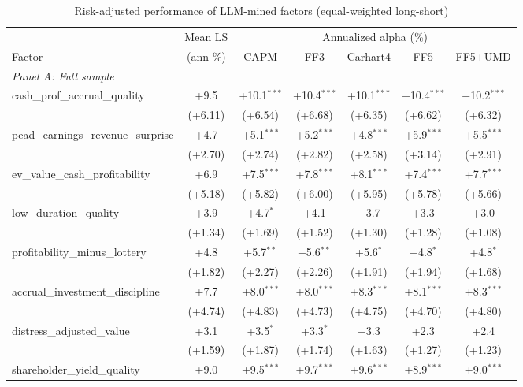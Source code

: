 \begin{table}[htbp]\centering
\caption{Risk-adjusted performance of LLM-mined factors (equal-weighted long-short)}
\label{tab:alphas_ew}
\begin{threeparttable}\footnotesize
\begin{tabular}{lcccccc}
\toprule
 & Mean LS & \multicolumn{5}{c}{Annualized alpha (\%)} \\
\cmidrule(lr){3-7}
Factor & (ann \%) & CAPM & FF3 & Carhart4 & FF5 & FF5+UMD \\
\midrule
\multicolumn{7}{l}{\textit{Panel A: Full sample}} \\
\addlinespace
cash\_prof\_accrual\_quality & +9.5 & +10.1$^{***}$ & +10.4$^{***}$ & +10.1$^{***}$ & +10.4$^{***}$ & +10.2$^{***}$ \\
 & (+6.11) & (+6.54) & (+6.68) & (+6.35) & (+6.62) & (+6.32) \\
\addlinespace
pead\_earnings\_revenue\_surprise & +4.7 & +5.1$^{***}$ & +5.2$^{***}$ & +4.8$^{***}$ & +5.9$^{***}$ & +5.5$^{***}$ \\
 & (+2.70) & (+2.74) & (+2.82) & (+2.58) & (+3.14) & (+2.91) \\
\addlinespace
ev\_value\_cash\_profitability & +6.9 & +7.5$^{***}$ & +7.8$^{***}$ & +8.1$^{***}$ & +7.4$^{***}$ & +7.7$^{***}$ \\
 & (+5.18) & (+5.82) & (+6.00) & (+5.95) & (+5.78) & (+5.66) \\
\addlinespace
low\_duration\_quality & +3.9 & +4.7$^{*}$ & +4.1 & +3.7 & +3.3 & +3.0 \\
 & (+1.34) & (+1.69) & (+1.52) & (+1.30) & (+1.28) & (+1.08) \\
\addlinespace
profitability\_minus\_lottery & +4.8 & +5.7$^{**}$ & +5.6$^{**}$ & +5.6$^{*}$ & +4.8$^{*}$ & +4.8$^{*}$ \\
 & (+1.82) & (+2.27) & (+2.26) & (+1.91) & (+1.94) & (+1.68) \\
\addlinespace
accrual\_investment\_discipline & +7.7 & +8.0$^{***}$ & +8.0$^{***}$ & +8.3$^{***}$ & +8.1$^{***}$ & +8.3$^{***}$ \\
 & (+4.74) & (+4.83) & (+4.73) & (+4.75) & (+4.70) & (+4.80) \\
\addlinespace
distress\_adjusted\_value & +3.1 & +3.5$^{*}$ & +3.3$^{*}$ & +3.3 & +2.3 & +2.4 \\
 & (+1.59) & (+1.87) & (+1.74) & (+1.63) & (+1.27) & (+1.23) \\
\addlinespace
shareholder\_yield\_quality & +9.0 & +9.5$^{***}$ & +9.7$^{***}$ & +9.6$^{***}$ & +8.9$^{***}$ & +9.0$^{***}$ \\

\end{tabular}
\end{threeparttable}
\end{table}
